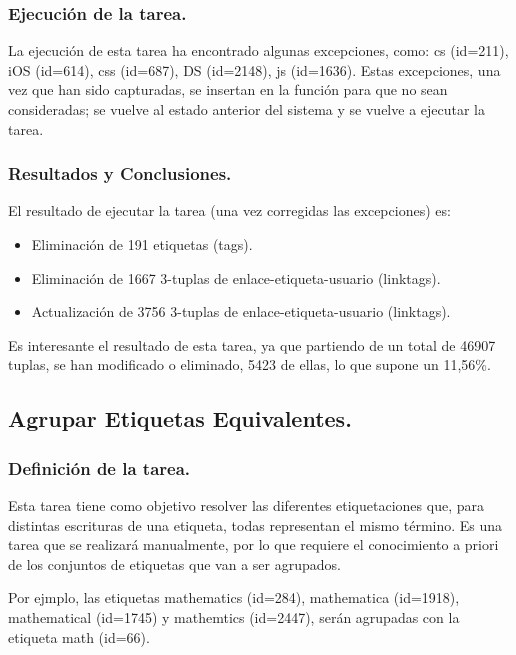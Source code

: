 \subsubsection{Ejecución de la tarea.}


La ejecución de esta tarea ha encontrado algunas excepciones, como: cs (id=211), iOS (id=614), css (id=687), DS (id=2148), js (id=1636). Estas excepciones, una vez que han sido capturadas, se insertan en la función para que no sean consideradas; se vuelve al estado anterior del sistema y se vuelve a ejecutar la tarea.

\subsubsection{Resultados y Conclusiones.}

El resultado de ejecutar la tarea (una vez corregidas las excepciones) es:
\begin{itemize}
\item    Eliminación de 191 etiquetas (tags).
\item    Eliminación de 1667 3-tuplas de enlace-etiqueta-usuario (linktags).
\item    Actualización de 3756 3-tuplas de enlace-etiqueta-usuario (linktags).
\end{itemize}

Es interesante el resultado de esta tarea, ya que partiendo de un total de 46907 tuplas, se han modificado o eliminado, 5423 de ellas, lo que supone un 11,56\%. 



\subsection{Agrupar Etiquetas Equivalentes.}

\subsubsection{Definición de la tarea.}

Esta tarea tiene como objetivo resolver las diferentes etiquetaciones que, para distintas escrituras de una etiqueta, todas representan el mismo término. Es una tarea que se realizará manualmente, por lo que requiere el conocimiento a priori de los conjuntos de etiquetas que van a ser agrupados.

Por ejmplo, las etiquetas mathematics (id=284), mathematica (id=1918), mathematical (id=1745) y mathemtics (id=2447), serán agrupadas con la etiqueta math (id=66).


